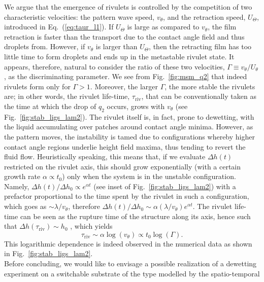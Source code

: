 We argue that the emergence of rivulets is controlled by the competition of two characteristic velocities: the pattern wave speed, $v_{\theta}$, and the retraction speed, $U_{\Theta}$, introduced in Eq.~(\ref{eq:taur_l1}). 
If $U_{\Theta}$ is large as compared to $v_{\theta}$, the film retraction is faster than the transport due to the contact angle field and thus droplets from. However, if $v_{\theta}$ is larger than $U_{\Theta}$, then the retracting film has too little time to form droplets and ends up in the metastable rivulet state. It appears, therefore, natural to consider the ratio of these two velocities, 
$\Gamma \equiv v_{\theta}/U_{\theta}$, as the discriminating parameter.
We see from Fig.~\ref{fig:msm_q2} that indeed rivulets form only for $\Gamma > 1$. 
Moreover, the larger $\Gamma$, the more stable the rivulets are; in other words, the rivulet life-time, $\tau_{\text{riv}}$, that can be conventionally taken as the time at which the drop of $q_2$ occurs, grows with $v_{\theta}$ (see Fig.~\ref{fig:stab_ligs_lam2}).
The rivulet itself is, in fact, prone to dewetting, with the liquid accumulating over patches around contact angle minima. However, as the pattern moves, the instability is tamed due to configurations whereby higher contact angle regions underlie height field maxima, thus tending to revert the fluid flow.
Heuristically speaking, this means that, if we evaluate $\Delta h(t)$ restricted on the rivulet axis, this should grow exponentially (with a certain growth rate $\alpha \propto t_0$) only when the system is in the unstable configuration. Namely, $\Delta h(t)/\Delta h_0 \propto e^{\alpha t}$ (see inset of Fig.~\ref{fig:stab_ligs_lam2}) with a prefactor proportional to the time spent by the rivulet in such a configuration, which goes as $\sim \lambda/v_{\theta}$, therefore 
$\Delta h(t)/\Delta h_0 \sim \alpha (\lambda/v_{\theta})e^{\alpha t}$. 
The rivulet life-time can be seen as the rupture time of the structure along its axis, hence such that $\Delta h (\tau_{\text{riv}}) \sim h_0$ \cite{PhysRevE.104.034801}, which yields
\begin{equation}\label{eq:rivlt}
    \tau_{\text{riv}} \sim \alpha \log(v_{\theta}) \propto t_0 \log(\Gamma). 
\end{equation}
This logarithmic dependence is indeed observed in the numerical data as shown in Fig.~\ref{fig:stab_ligs_lam2}.\\
Before concluding, we would like to envisage a possible realization of a 
dewetting experiment on a switchable substrate of the type modelled by the spatio-temporal 
